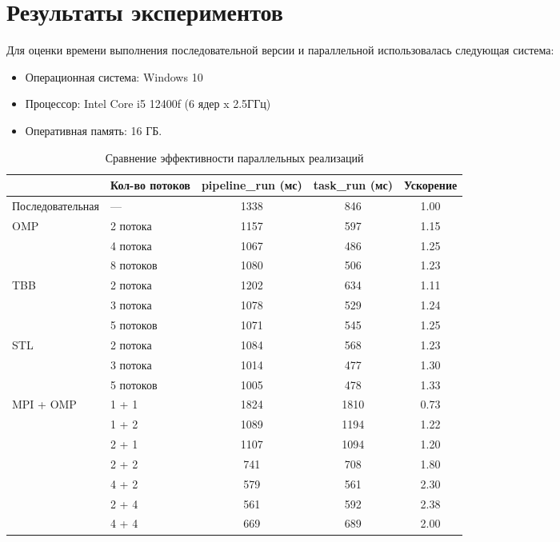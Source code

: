 \documentclass[a4paper,12pt]{article}
\begin{document}
\section{Результаты экспериментов}
Для оценки времени выполнения последовательной версии и параллельной использовалась следующая система:
\begin{itemize}
    \item Операционная система: Windows 10
    \item Процессор: Intel Core i5 12400f (6 ядер x 2.5ГГц)
    \item Оперативная память: 16 ГБ.
\end{itemize}
\begin{table}[H]
\centering
\footnotesize
\caption{Сравнение эффективности параллельных реализаций}
\begin{tabularx}{\textwidth}{|X|l|c|c|c|}
\hline
\textbf{} & \textbf{Кол-во потоков} & \textbf{pipeline\_run (мс)} & \textbf{task\_run (мс)} & \textbf{Ускорение} \\
\hline
Последовательная & — & 1338 & 846 & 1.00 \\
\hline
\multirow{3}{*}{OMP} 
  & 2 потока & 1157 & 597 & 1.15 \\
  & 4 потока & 1067 & 486 & 1.25 \\
  & 8 потоков & 1080 & 506 & 1.23 \\
\hline
\multirow{3}{*}{TBB} 
  & 2 потока & 1202 & 634 & 1.11 \\
  & 3 потока & 1078 & 529 & 1.24 \\
  & 5 потоков & 1071 & 545 & 1.25 \\
\hline
\multirow{3}{*}{STL} 
  & 2 потока & 1084 & 568 & 1.23 \\
  & 3 потока & 1014 & 477 & 1.30 \\
  & 5 потоков & 1005 & 478 & 1.33 \\
\hline
\multirow{5}{*}{MPI + OMP}  
& 1 + 1 & 1824 & 1810 & 0.73 \\
& 1 + 2 & 1089 & 1194 & 1.22 \\
  & 2 + 1 & 1107 & 1094 & 1.20 \\
  & 2 + 2 & 741 & 708 & 1.80 \\
  & 4 + 2 & 579 & 561 & 2.30 \\
  & 2 + 4 & 561 & 592 & 2.38 \\
  & 4 + 4 & 669 & 689 & 2.00 \\
\hline
\end{tabularx}
\end{table}
\end{document}
